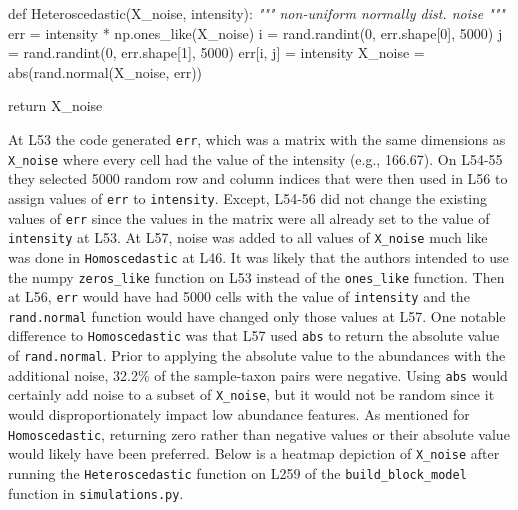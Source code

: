 \documentclass[
]{article}
\newenvironment{Shaded}{}{}
\newcommand{\BuiltInTok}[1]{\textcolor[rgb]{0.65,0.15,0.64}{#1}}
\newcommand{\CommentTok}[1]{\textcolor[rgb]{0.63,0.63,0.65}{\textit{#1}}}
\newcommand{\ControlFlowTok}[1]{\textcolor[rgb]{0.65,0.15,0.64}{#1}}
\newcommand{\DecValTok}[1]{\textcolor[rgb]{0.60,0.41,0.00}{#1}}
\newcommand{\KeywordTok}[1]{\textcolor[rgb]{0.65,0.15,0.64}{#1}}
\newcommand{\NormalTok}[1]{\textcolor[rgb]{0.22,0.23,0.26}{#1}}
\newcommand{\OperatorTok}[1]{\textcolor[rgb]{0.65,0.15,0.64}{#1}}
\begin{document}
\footnotesize

\begin{Shaded}
\begin{Highlighting}[numbers=left,,firstnumber=51,]
\KeywordTok{def}\NormalTok{ Heteroscedastic(X\_noise, intensity):}
    \CommentTok{""" non{-}uniform normally dist. noise """}
\NormalTok{    err }\OperatorTok{=}\NormalTok{ intensity }\OperatorTok{*}\NormalTok{ np.ones\_like(X\_noise)}
\NormalTok{    i }\OperatorTok{=}\NormalTok{ rand.randint(}\DecValTok{0}\NormalTok{, err.shape[}\DecValTok{0}\NormalTok{], }\DecValTok{5000}\NormalTok{)}
\NormalTok{    j }\OperatorTok{=}\NormalTok{ rand.randint(}\DecValTok{0}\NormalTok{, err.shape[}\DecValTok{1}\NormalTok{], }\DecValTok{5000}\NormalTok{)}
\NormalTok{    err[i, j] }\OperatorTok{=}\NormalTok{ intensity}
\NormalTok{    X\_noise }\OperatorTok{=} \BuiltInTok{abs}\NormalTok{(rand.normal(X\_noise, err))}

    \ControlFlowTok{return}\NormalTok{ X\_noise}
\end{Highlighting}
\end{Shaded}

\normalsize{}

At L53 the code generated \texttt{err}, which was a matrix with the same
dimensions as \texttt{X\_noise} where every cell had the value of the
intensity (e.g., 166.67). On L54-55 they selected 5000 random row and
column indices that were then used in L56 to assign values of
\texttt{err} to \texttt{intensity}. Except, L54-56 did not change the
existing values of \texttt{err} since the values in the matrix were all
already set to the value of \texttt{intensity} at L53. At L57, noise was
added to all values of \texttt{X\_noise} much like was done in
\texttt{Homoscedastic} at L46. It was likely that the authors intended
to use the numpy \texttt{zeros\_like} function on L53 instead of the
\texttt{ones\_like} function. Then at L56, \texttt{err} would have had
5000 cells with the value of \texttt{intensity} and the
\texttt{rand.normal} function would have changed only those values at
L57. One notable difference to \texttt{Homoscedastic} was that L57 used
\texttt{abs} to return the absolute value of \texttt{rand.normal}. Prior
to applying the absolute value to the abundances with the additional
noise, 32.2\% of the sample-taxon pairs were negative. Using
\texttt{abs} would certainly add noise to a subset of \texttt{X\_noise},
but it would not be random since it would disproportionately impact low
abundance features. As mentioned for \texttt{Homoscedastic}, returning
zero rather than negative values or their absolute value would likely
have been preferred. Below is a heatmap depiction of \texttt{X\_noise}
after running the \texttt{Heteroscedastic} function on L259 of the
\texttt{build\_block\_model} function in \texttt{simulations.py}.
\end{document}
